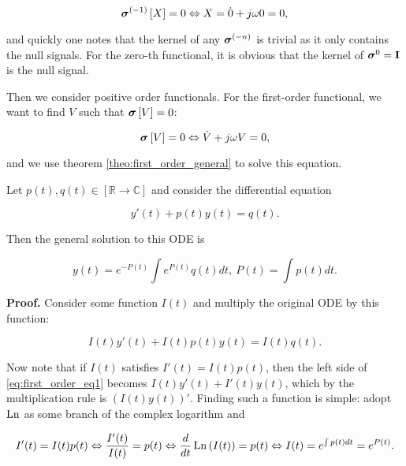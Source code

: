 \begin{equation} \boldsymbol{\sigma}^{(-1)}\left[X\right] = 0 \Leftrightarrow X = \dot{0} + j\omega 0 = 0, \end{equation}

	\noindent and quickly one notes that the kernel of any $\boldsymbol{\sigma}^{(-n)}$ is trivial as it only contains the null signals. For the zero-th functional, it is obvious that the kernel of $\boldsymbol{\sigma}^{0} = \mathbf{I}$ is the null signal.

	Then we consider positive order functionals. For the first-order functional, we want to find $V$ such that $\boldsymbol{\sigma}\left[V\right] = 0$:

\begin{equation}  \boldsymbol{\sigma}\left[V\right] = 0 \Leftrightarrow \dot{V} + j\omega V = 0, \label{eq:1st_order_null_ode}\end{equation}

	\noindent and we use theorem \ref{theo:first_order_general} to solve this equation.

\begin{theorem}\label{theo:first_order_general} %
	Let $p(t),q(t)\in\left[\mathbb{R}\to\mathbb{C}\right]$ and consider the differential equation

\begin{equation} y'(t) + p(t)y(t) = q(t).\end{equation}

	Then the general solution to this ODE is

\begin{equation} y(t) = e^{-P(t)}\int e^{P(t)}q(t)dt,\ P(t) = \int p(t)dt. \end{equation}
\end{theorem}
\textbf{Proof.} Consider some function $I(t)$ and multiply the original ODE by this function: 

\begin{equation} I(t)y'(t) + I(t)p(t)y(t) = I(t)q(t). \label{eq:first_order_eq1}\end{equation}

	Now note that if $I(t)$ satisfies $I'(t) = I(t)p(t)$, then the left side of \eqref{eq:first_order_eq1} becomes $I(t)y'(t) + I'(t)y(t)$, which by the multiplication rule is $\left(I(t)y(t)\right)'$. Finding such a function is simple: adopt $\operatorname{Ln}$ as some branch of the complex logarithm and

\begin{equation} I'(t) = I(t)p(t) \Leftrightarrow \dfrac{I'(t)}{I(t)} = p(t) \Leftrightarrow \dfrac{d}{dt}\operatorname{Ln}\left(I(t)\right) = p(t) \Leftrightarrow I(t) = e^{\int p(t)dt} = e^{P(t)}. \label{eq:first_order_eq2}\end{equation}

